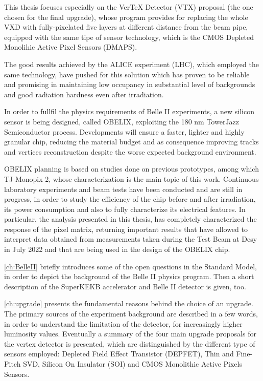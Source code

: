 This thesis focuses especially on the VerTeX Detector (VTX) proposal (the one chosen for the final upgrade), whose program provides for replacing the whole VXD with fully-pixelated five layers at different distance from the beam pipe, equipped with the same tipe of sensor technology, which is the CMOS Depleted Monolihic Active Pixel Sensors (DMAPS). 

The good results achieved by the ALICE experiment (LHC), which employed the same technology, have pushed for this solution which has proven to be reliable and promising in maintaining low occupancy in substantial level of backgrounds and good radiation hardness even after irradiation. 

In order to fullfil the physics requirements of Belle II experiments, a new silicon sensor is being designed, called OBELIX, exploiting the 180 nm TowerJazz Semiconductor process. Developments will ensure a faster, lighter and highly granular chip, reducing the material budget and as consequence improving tracks and vertices reconstruction despite the worse expected background environment. 

OBELIX planning is based on studies done on previous prototypes, among which TJ-Monopix 2, whose characterization is the main topic of this work. Continuous laboratory experiments and beam tests have been conducted and are still in progress, in order to study the efficiency of the chip before and after irradiation, its power consumption and also to fully characterize its electrical features. 
In particular, the analysis presented in this thesis, has completely characterized the response of the pixel matrix, returning important results that have allowed to interpret data obtained from measurements taken during the Test Beam at Desy in July 2022 and that are being used in the design of the OBELIX chip.


\autoref{ch:BelleII} briefly introduces some of the open questions in the Standard Model, in order to depict the background of the Belle II physics program. Then a short description of the SuperKEKB accelerator and Belle II detector is given, too. 

\autoref{ch:upgrade} presents the fundamental reasons behind the choice of an upgrade. The primary sources of the experiment background are described in a few words, in order to understand the limitation of the detector, for increasingly higher luminosity values. Eventually a summary of the four main upgrade proposals for the vertex detector is presented, which are distinguished by the different type of sensors employed: Depleted Field Effect Transistor (DEPFET), Thin and Fine-Pitch SVD, Silicon On Insulator (SOI) and CMOS Monolithic Active Pixels Sensors.


